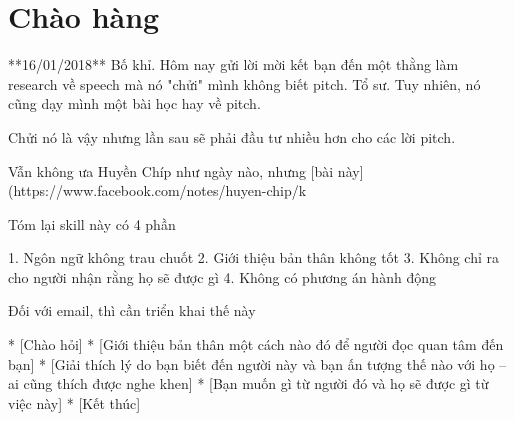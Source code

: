 \chapter{Chào hàng}

**16/01/2018** Bố khỉ. Hôm nay gửi lời mời kết bạn đến một thằng làm research về speech mà nó "chửi" mình không biết pitch. Tổ sư. Tuy nhiên, nó cũng dạy mình một bài học hay về pitch.

Chửi nó là vậy nhưng lần sau sẽ phải đầu tư nhiều hơn cho các lời pitch.

Vẫn không ưa Huyền Chíp như ngày nào, nhưng [bài này](https://www.facebook.com/notes/huyen-chip/k%

Tóm lại skill này có 4 phần

1. Ngôn ngữ không trau chuốt
2. Giới thiệu bản thân không tốt
3. Không chỉ ra cho người nhận rằng họ sẽ được gì
4. Không có phương án hành động

Đối với email, thì cần triển khai thế này

* [Chào hỏi]
* [Giới thiệu bản thân một cách nào đó để người đọc quan tâm đến bạn]
* [Giải thích lý do bạn biết đến người này và bạn ấn tượng thế nào với họ -- ai cũng thích được nghe khen]
* [Bạn muốn gì từ người đó và họ sẽ được gì từ việc này]
* [Kết thúc]